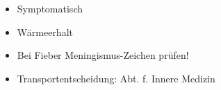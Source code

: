 \label{m:pneumonie}
\begin{itemize}
  \item Symptomatisch
  \item Wärmeerhalt
  \item Bei Fieber Meningismus-Zeichen prüfen!
  \item Transportentscheidung: Abt. f. Innere Medizin
\end{itemize}